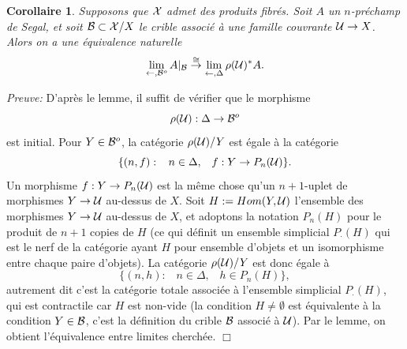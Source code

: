 \documentclass[12pt]{article}
\newcommand{\eop}{\hfill $\Box$\vspace{.1in}}
\newtheorem{corollaire}[lemma]{Corollaire}
\newcommand{\Bb}{{\cal B}}
\newcommand{\Uu}{{\cal U}}
\newcommand{\Xx}{{\cal X}}
\begin{document}
\begin{corollaire}
\label{limsurdelta}
Supposons que $\Xx$ admet des produits fibr\'es.
Soit $A$ un $n$-pr\'echamp de Segal, et soit $\Bb \subset
\Xx /X$
le crible associ\'e \`a une famille couvrante $\Uu \rightarrow X$.
Alors on a une \'equivalence naturelle
$$
\lim _{\leftarrow , \Bb ^o} A|_{\Bb} \stackrel{\cong}{\rightarrow}
\lim _{\leftarrow , \Delta  } \rho (\Uu )^{\ast}A.
$$
\end{corollaire}
{\em Preuve:}
D'apr\`es le lemme, il suffit de v\'erifier que le morphisme
$$
\rho (\Uu ): \Delta \rightarrow \Bb ^o
$$
est initial. Pour $Y\in \Bb ^o$, la cat\'egorie $\rho (\Uu )/Y$
est \'egale \`a la cat\'egorie
$$
\{ (n,f): \;\;\; n\in \Delta , \;\;\; f: Y\rightarrow P_n(\Uu )\} .
$$
Un morphisme $f: Y\rightarrow P_n(\Uu )$ est la m\^eme chose qu'un
$n+1$-uplet de morphismes $Y\rightarrow \Uu$ au-dessus de $X$. Soit $H:= Hom
(Y,\Uu )$ l'ensemble des morphismes $Y\rightarrow \Uu$ au-dessus de $X$,
et adoptons la notation $P_n(H)$ pour le produit
de $n+1$ copies de $H$ (ce qui d\'efinit un
ensemble simplicial $P_{\cdot}(H)$ qui est le nerf de la
cat\'egorie ayant $H$
pour ensemble d'objets et un isomorphisme entre chaque paire d'objets). La
cat\'egorie $\rho (\Uu )/Y$ est donc \'egale \`a
$$
\{ (n,h): \;\;\; n\in \Delta , \;\;\; h\in P_n(H)\} ,
$$
autrement dit c'est la cat\'egorie totale associ\'ee \`a
l'ensemble simplicial
$P_{\cdot}(H)$,
qui est contractile car $H$ est non-vide (la condition $H\neq \emptyset$
est \'equivalente \`a la condition $Y\in \Bb$, c'est la d\'efinition du crible
$\Bb$ associ\'e \`a $\Uu$). Par le lemme, on obtient l'\'equivalence entre
limites cherch\'ee.
\eop
\end{document}
